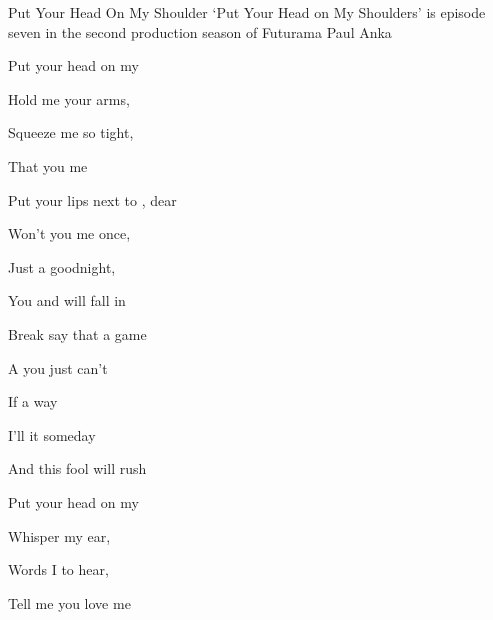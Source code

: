 \begin{SBSong}{Put Your Head On My Shoulder}
  {`Put Your Head on My Shoulders' is episode seven in the second production season of Futurama}
  {Paul Anka}
  \begin{SBVerse}
	Put your head on my  
	
	Hold me  your arms,  
	
	Squeeze me  so tight,   
	
	That you  me  
  \end{SBVerse}
  \begin{SBVerse}
	Put your lips next to , dear 
	
	Won't you  me once,  
	
	Just a  goodnight,   
	
	You and  will fall in 
  \end{SBVerse}
  \begin{SBBracket}{Break}
	 say that  a game
	
	A  you just can't 
	
	If  a way
	
	I'll  it someday
	
	And  this fool will rush   
  \end{SBBracket}
  \begin{SBVerse}
	Put your head on my  
	
	Whisper  my ear,  
	
	Words I  to hear,   
	
	Tell me  you love me  
  \end{SBVerse}
\end{SBSong}

